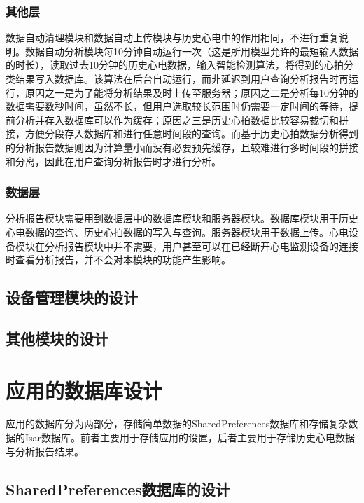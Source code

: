 \subsubsection{其他层}

数据自动清理模块和数据自动上传模块与历史心电中的作用相同，不进行重复说明。数据自动分析模块每10分钟自动运行一次（这是所用模型允许的最短输入数据的时长），读取过去10分钟的历史心电数据，输入智能检测算法，将得到的心拍分类结果写入数据库。该算法在后台自动运行，而非延迟到用户查询分析报告时再运行，原因之一是为了能将分析结果及时上传至服务器；原因之二是分析每10分钟的数据需要数秒时间，虽然不长，但用户选取较长范围时仍需要一定时间的等待，提前分析并存入数据库可以作为缓存；原因之三是历史心拍数据比较容易裁切和拼接，方便分段存入数据库和进行任意时间段的查询。而基于历史心拍数据分析得到的分析报告数据则因为计算量小而没有必要预先缓存，且较难进行多时间段的拼接和分离，因此在用户查询分析报告时才进行分析。

\subsubsection{数据层}

分析报告模块需要用到数据层中的数据库模块和服务器模块。数据库模块用于历史心电数据的查询、历史心拍数据的写入与查询。服务器模块用于数据上传。心电设备模块在分析报告模块中并不需要，用户甚至可以在已经断开心电监测设备的连接时查看分析报告，并不会对本模块的功能产生影响。

\subsection{设备管理模块的设计}\label{subsec:device-design}


\subsection{其他模块的设计}\label{subsec:other-design}



\section{应用的数据库设计}\label{sec:db-design}

应用的数据库分为两部分，存储简单数据的SharedPreferences数据库和存储复杂数据的Isar数据库。前者主要用于存储应用的设置，后者主要用于存储历史心电数据与分析报告结果。

\subsection{SharedPreferences数据库的设计}\label{subsec:shared-preferences}

